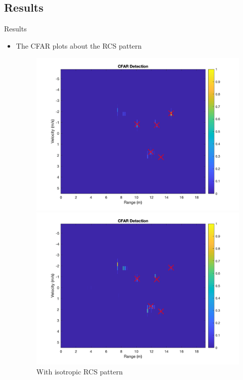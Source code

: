 \documentclass{beamer}
\newcounter{section}
\begin{document}
\subsection{Results}
\begin{frame}[t]{Results}
	\begin{itemize}
	    \item The CFAR plots about the RCS pattern
        \vspace{0.5\baselineskip}
            \begin{figure}
                \centering
                \begin{minipage}{0.45\textwidth}
                    \centering
                    \includegraphics[height=0.8\textwidth]{figures/3c_beampattern.png}
                    \caption{With isotropic RCS pattern}
                \end{minipage}
                \begin{minipage}{0.45\textwidth}
                    \centering
                    \includegraphics[height=0.8\textwidth]{figures/4c_empty.png}

\end{minipage}
\end{figure}
\end{itemize}
\end{frame}
\end{document}
